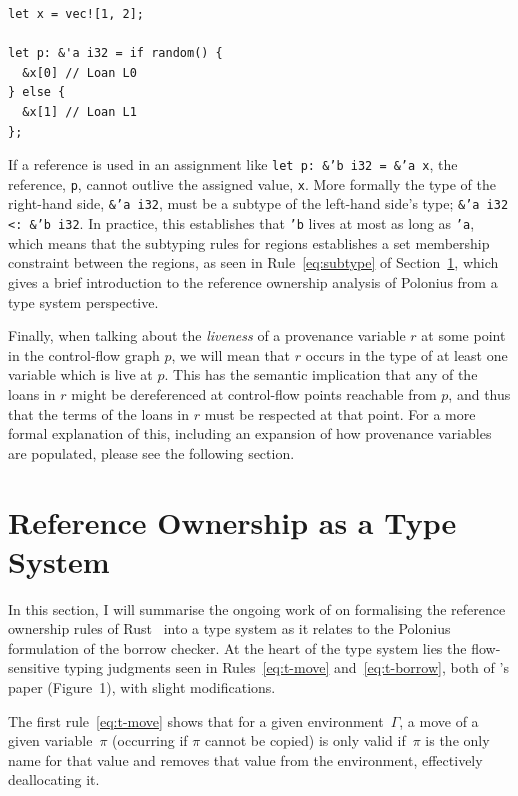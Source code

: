 \documentclass[11pt,a4paper,twoside,openany]{report}
\newenvironment{sourcecode}{\captionsetup{type=listing}}{}
\newcommand{\InRust}[1]{\texttt{#1}}
\begin{document}
\begin{sourcecode}
  \label{lst:multi-path-borrow}
\begin{verbatim}
let x = vec![1, 2];

let p: &'a i32 = if random() {
  &x[0] // Loan L0
} else {
  &x[1] // Loan L1
};
\end{verbatim}
\end{sourcecode}

If a reference is used in an assignment like \InRust{let p: &'b i32 = &'a x},
the reference, \InRust{p}, cannot outlive the assigned value, \InRust{x}. More
formally the type of the right-hand side, \InRust{&'a i32}, must be a subtype of
the left-hand side's type; \InRust{&'a i32 <: &'b i32}. In practice, this
establishes that \InRust{'b} lives at most as long as \InRust{'a}, which means
that the subtyping rules for regions establishes a set membership constraint
between the regions, as seen in Rule~\ref{eq:subtype} of
Section~\ref{sec:type-system}, which gives a brief introduction to the reference
ownership analysis of Polonius from a type system perspective.

Finally, when talking about the \emph{liveness} of a provenance variable $r$ at
some point in the control-flow graph $p$, we will mean that $r$ occurs in the
type of at least one variable which is live at $p$. This has the semantic
implication that any of the loans in $r$ might be dereferenced at control-flow
points reachable from $p$, and thus that the terms of the loans in $r$ must be
respected at that point. For a more formal explanation of this, including an
expansion of how provenance variables are populated, please see the following
section.

\section{Reference Ownership as a Type System}\label{sec:type-system}

In this section, I will summarise the ongoing work of
\citeauthor{weiss_oxide:_2019} on formalising the reference ownership rules of
Rust~\cite{weiss_oxide:_2019} into a type system as it relates to the Polonius
formulation of the borrow checker. At the heart of the type system lies the
flow-sensitive typing judgments seen in Rules~\ref{eq:t-move}
and~\ref{eq:t-borrow}, both of \citeauthor{weiss_oxide:_2019}'s paper
(Figure~1), with slight modifications.

The first rule~\eqref{eq:t-move} shows that for a given environment~$\Gamma$, a
move of a given variable~$\pi$ (occurring if $\pi$ cannot be copied) is only
valid if~$\pi$ is the only name for that value and removes that value from the
environment, effectively deallocating it.
\end{document}
